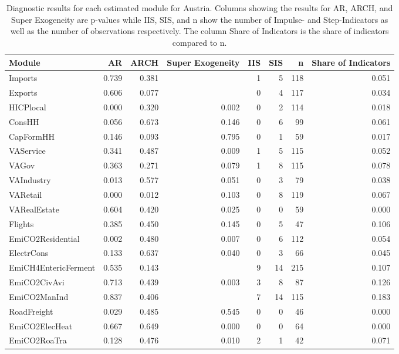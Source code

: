 \begin{table}
\centering
\caption{\label{tab:AT_diagnostics}Diagnostic results for each estimated module for Austria. Columns showing the results for AR, ARCH, and Super Exogeneity are p-values while IIS, SIS, and n show the number of Impulse- and Step-Indicators as well as the number of observations respectively. The column Share of Indicators is the share of indicators compared to n.}
\centering
\begin{tabular}[t]{lrrrrrrr}
\toprule
Module & AR & ARCH & Super Exogeneity & IIS & SIS & n & Share of Indicators\\
\midrule
Imports & 0.739 & 0.381 &  & 1 & 5 & 118 & 0.051\\
Exports & 0.606 & 0.077 &  & 0 & 4 & 117 & 0.034\\
HICPlocal & 0.000 & 0.320 & 0.002 & 0 & 2 & 114 & 0.018\\
ConsHH & 0.056 & 0.673 & 0.146 & 0 & 6 & 99 & 0.061\\
CapFormHH & 0.146 & 0.093 & 0.795 & 0 & 1 & 59 & 0.017\\
\addlinespace
VAService & 0.341 & 0.487 & 0.009 & 1 & 5 & 115 & 0.052\\
VAGov & 0.363 & 0.271 & 0.079 & 1 & 8 & 115 & 0.078\\
VAIndustry & 0.013 & 0.577 & 0.051 & 0 & 3 & 79 & 0.038\\
VARetail & 0.000 & 0.012 & 0.103 & 0 & 8 & 119 & 0.067\\
VARealEstate & 0.604 & 0.420 & 0.025 & 0 & 0 & 59 & 0.000\\
\addlinespace
Flights & 0.385 & 0.450 & 0.145 & 0 & 5 & 47 & 0.106\\
EmiCO2Residential & 0.002 & 0.480 & 0.007 & 0 & 6 & 112 & 0.054\\
ElectrCons & 0.133 & 0.637 & 0.040 & 0 & 3 & 66 & 0.045\\
EmiCH4EntericFerment & 0.535 & 0.143 &  & 9 & 14 & 215 & 0.107\\
EmiCO2CivAvi & 0.713 & 0.439 & 0.003 & 3 & 8 & 87 & 0.126\\
\addlinespace
EmiCO2ManInd & 0.837 & 0.406 &  & 7 & 14 & 115 & 0.183\\
RoadFreight & 0.029 & 0.485 & 0.545 & 0 & 0 & 46 & 0.000\\
EmiCO2ElecHeat & 0.667 & 0.649 & 0.000 & 0 & 0 & 64 & 0.000\\
EmiCO2RoaTra & 0.128 & 0.476 & 0.010 & 2 & 1 & 42 & 0.071\\
\bottomrule
\end{tabular}
\end{table}

